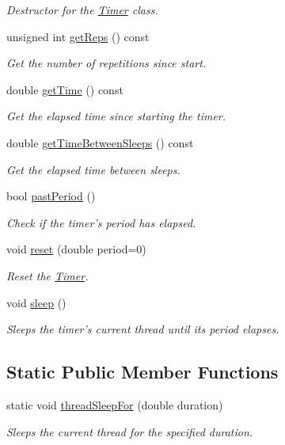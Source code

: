 \begin{DoxyCompactItemize}
\begin{DoxyCompactList}\small\item\em Destructor for the \hyperlink{class_timer}{Timer} class. \end{DoxyCompactList}\item 
unsigned int \hyperlink{class_timer_ab7c94a5d0f7d1e3a0a2370c9bc5f68f3}{get\+Reps} () const 
\begin{DoxyCompactList}\small\item\em Get the number of repetitions since start. \end{DoxyCompactList}\item 
double \hyperlink{class_timer_a8a1e22b1647df0f43d98cbfa1278a210}{get\+Time} () const 
\begin{DoxyCompactList}\small\item\em Get the elapsed time since starting the timer. \end{DoxyCompactList}\item 
double \hyperlink{class_timer_a354cf2011ae82fdb28011bb544e87307}{get\+Time\+Between\+Sleeps} () const 
\begin{DoxyCompactList}\small\item\em Get the elapsed time between sleeps. \end{DoxyCompactList}\item 
bool \hyperlink{class_timer_a1843db617c4da5826e0dd709b259bdb4}{past\+Period} ()
\begin{DoxyCompactList}\small\item\em Check if the timer's period has elapsed. \end{DoxyCompactList}\item 
void \hyperlink{class_timer_a7f1c5a4ef711075eec9a42afb6204a25}{reset} (double period=0)
\begin{DoxyCompactList}\small\item\em Reset the \hyperlink{class_timer}{Timer}. \end{DoxyCompactList}\item 
void \hyperlink{class_timer_a6b3d6e79d249b567a71104c4091d652f}{sleep} ()
\begin{DoxyCompactList}\small\item\em Sleeps the timer's current thread until its period elapses. \end{DoxyCompactList}\end{DoxyCompactItemize}
\subsection*{Static Public Member Functions}
\begin{DoxyCompactItemize}
\item 
static void \hyperlink{class_timer_aed9d38e6cefef77017f990558ae72ebb}{thread\+Sleep\+For} (double duration)
\begin{DoxyCompactList}\small\item\em Sleeps the current thread for the specified duration. \end{DoxyCompactList}\end{DoxyCompactItemize}


